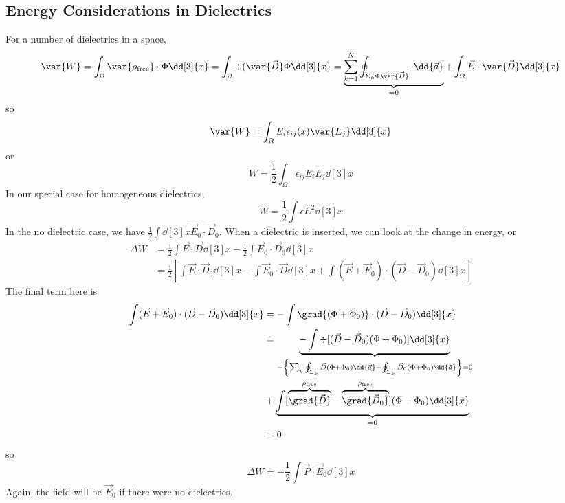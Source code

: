 \documentclass[a4paper,twoside,master.tex]{subfiles}
\begin{document}
\subsection{Energy Considerations in Dielectrics}
\label{sub:energy_considerations_in_dielectrics}
For a number of dielectrics in a space,
\begin{equation}
    \var{W} = \int_{\Omega} \var{\rho_{\text{free}}} \cdot \Phi \dd[3]{x} = \int_{\Omega} \div{(\var{\vec{D}}}\Phi  \dd[3]{x} = \underbrace{\sum_{k=1}^{N} \oint_{\Sigma_{k} \Phi \var{ \vec{D}}} \cdot \dd{ \vec{a}}}_{=0} + \int_{\Omega} \vec{E} \cdot \var{ \vec{D}} \dd[3]{x}
\end{equation}
so
\begin{equation}
    \var{W} = \int_{\Omega} E_i \epsilon_{ij}(x) \var{E_j} \dd[3]{x}
\end{equation}
or
\begin{equation}
    W = \frac{1}{2} \int_{\Omega} \epsilon_{ij} E_{i} E_{j} \dd[3]{x}
\end{equation}
In our special case for homogeneous dielectrics,
\begin{equation}
    W = \frac{1}{2} \int \epsilon E^2 \dd[3]{x}
\end{equation}
In the no dielectric case, we have $ \frac{1}{2} \int \dd[3]{x} \vec{E}_0 \cdot \vec{D}_0 $. When a dielectric is inserted, we can look at the change in energy, or
\begin{align}
    \Delta W &= \frac{1}{2} \int \vec{E} \cdot \vec{D} \dd[3]{x} - \frac{1}{2} \int \vec{E}_0 \cdot \vec{D}_0 \dd[3]{x}\\
    &= \frac{1}{2} \left[ \int \vec{E} \cdot \vec{D}_0 \dd[3]{x} - \int \vec{E}_0 \cdot \vec{D} \dd[3]{x} + \int (\vec{E} + \vec{E}_0) \cdot ( \vec{D} - \vec{D}_0)  \dd[3]{x} \right]
\end{align}
The final term here is
\begin{align}
    \int (\vec{E} + \vec{E}_0) \cdot ( \vec{D} - \vec{D}_0)  \dd[3]{x} &= - \int \grad{(\Phi + \Phi_0 )} \cdot ( \vec{D} - \vec{D}_0 ) \dd[3]{x}\\
    &= \underbrace{- \int \div{[( \vec{D} - \vec{D}_0)(\Phi + \Phi_0 )]} \dd[3]{x}}_{- \left\{ \sum_{k} \oint_{\Sigma_k} \vec{D} (\Phi + \Phi_0) \dd{ \vec{a}} - \oint_{\Sigma_k} \vec{D}_0 (\Phi + \Phi_0) \dd{ \vec{a}} \right\} = 0}\\ &+ \underbrace{\int [\overbrace{\grad{ \vec{D}}}^{\rho_{\text{free}}} - \overbrace{\grad{ \vec{D}_0}}^{\rho_{\text{free}}}](\Phi + \Phi_0) \dd[3]{x}}_{=0}\\ &= 0
\end{align}
so
\begin{equation}
    \Delta W = - \frac{1}{2} \int \vec{P} \cdot \vec{E}_0 \dd[3]{x}
\end{equation}
Again, the field will be $ \vec{E}_0 $ if there were no dielectrics.
\end{document}
